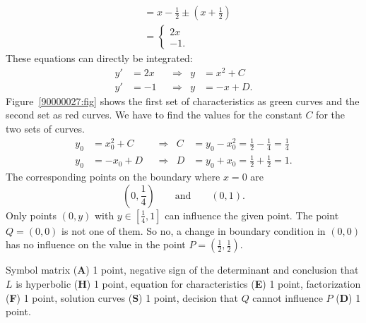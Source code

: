 \begin{loesung}
\begin{teilaufgaben}
\begin{align*}
\\
&=
x-{\textstyle\frac12} \pm (x+{\textstyle\frac12})
\\
&=
\begin{cases}
2x  \\
-1.
\end{cases}
\end{align*}
These equations can directly be integrated:
\[
\begin{aligned}
y'&=2x   &&\Rightarrow& y&= x^2 + C \\
y'&=-1   &&\Rightarrow& y&=-x   + D.
\end{aligned}
\]
Figure~\ref{90000027:fig} shows the first set of characteristics
as green curves and the second set as red curves.
We have to find the values for the constant $C$ for the two sets of
curves.
\[
\begin{aligned}
	y_0 &= x_0^2 + C         &
&\Rightarrow&
C &= y_0 - x_0^2 = \frac12-\frac14 = \frac{1}{4}\\
	y_0 &= -x_0 + D &
&\Rightarrow&
D &= y_0 + x_0 = \frac12 + \frac12 = 1.
\end{aligned}
\]
The corresponding points on the boundary where $x=0$ are
\[
(0,{\textstyle\frac14})
\qquad\text{and}\qquad
(0,1).
\]
Only points $(0,y)$ with $y\in[ \frac{1}{4}, 1]$ can
influence the given point.
The point $Q=(0,0)$ is not one of them.
So no, a change in boundary condition in $(0,0)$ has no influence on
the value in the point $P=(\frac12,\frac12)$.
\qedhere
\end{teilaufgaben}
\end{loesung}

\begin{bewertung}
Symbol matrix ({\bf A}) 1 point,
negative sign of the determinant and conclusion that $L$ is hyperbolic
({\bf H}) 1 point,
equation for characteristics ({\bf E}) 1 point,
factorization ({\bf F}) 1 point,
solution curves ({\bf S}) 1 point,
decision that $Q$ cannot influence $P$ ({\bf D}) 1 point.
\end{bewertung}

